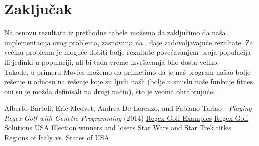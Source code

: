 \documentclass{article}
\begin{document}
\section{Zaključak}
Na osnovu rezultata iz prethodne tabele možemo da zaključimo da naša implementacija ovog problema, zasnovana na \cite{Bartoli}, daje zadovoljavajuće rezultate. Za većinu problema je moguće dobiti 
bolje rezultate povećavanjem broja populacija ili jedinki u populaciji, ali bi tada vreme izvršavanja bilo dosta veliko. \\
Takođe, u primeru Movies \cite{Movies} možemo da primetimo da je naš program našao bolje rešenje u odnosu na rešenje koje su ljudi našli (bolje u smislu naše funkcije fitnes, oni su je možda definisali na drugi način), što je veoma ohrabrujuće. \\

\newpage
{}
\begin{thebibliography}{9}
Alberto Bartoli, Eric Medvet, Andrea De Lorenzo, and Fabiano Tarlao - 
\textit{Playing Regex Golf with Genetic Programming} (2014)
\href{https://alf.nu/RegexGolf}{Regex Golf Examples}
\href{https://gist.github.com/Davidebyzero/9221685}{Regex Golf Solutions}
\href{https://pastebin.com/EvycCQTB}{USA Election winners and losers}
\href{http://zegnat.github.io/xkcd1313/}{Star Wars and Star Trek titles}
\href{https://codegolf.stackexchange.com/questions/17855/regex-golf-regions-of-italy-vs-states-of-usa}{Regions of Italy vs. States of USA}

\end{thebibliography}
\end{document}
